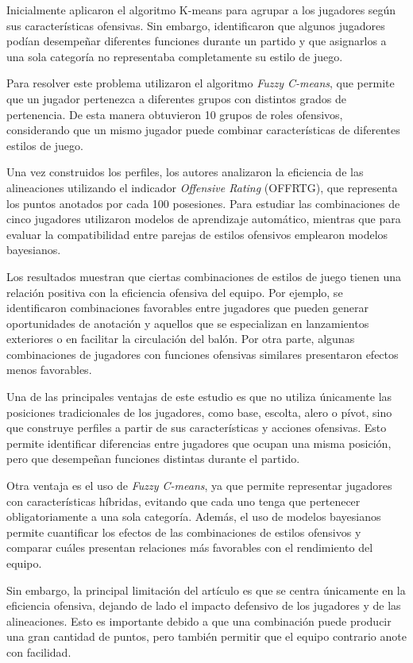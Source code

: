 Inicialmente aplicaron el algoritmo K-means para agrupar a los jugadores según sus características ofensivas. Sin embargo, identificaron que algunos jugadores podían desempeñar diferentes funciones durante un partido y que asignarlos a una sola categoría no representaba completamente su estilo de juego.

Para resolver este problema utilizaron el algoritmo \textit{Fuzzy C-means}, que permite que un jugador pertenezca a diferentes grupos con distintos grados de pertenencia. De esta manera obtuvieron 10 grupos de roles ofensivos, considerando que un mismo jugador puede combinar características de diferentes estilos de juego.

Una vez construidos los perfiles, los autores analizaron la eficiencia de las alineaciones utilizando el indicador \textit{Offensive Rating} (OFFRTG), que representa los puntos anotados por cada 100 posesiones. Para estudiar las combinaciones de cinco jugadores utilizaron modelos de aprendizaje automático, mientras que para evaluar la compatibilidad entre parejas de estilos ofensivos emplearon modelos bayesianos.

Los resultados muestran que ciertas combinaciones de estilos de juego tienen una relación positiva con la eficiencia ofensiva del equipo. Por ejemplo, se identificaron combinaciones favorables entre jugadores que pueden generar oportunidades de anotación y aquellos que se especializan en lanzamientos exteriores o en facilitar la circulación del balón. Por otra parte, algunas combinaciones de jugadores con funciones ofensivas similares presentaron efectos menos favorables.

Una de las principales ventajas de este estudio es que no utiliza únicamente las posiciones tradicionales de los jugadores, como base, escolta, alero o pívot, sino que construye perfiles a partir de sus características y acciones ofensivas. Esto permite identificar diferencias entre jugadores que ocupan una misma posición, pero que desempeñan funciones distintas durante el partido.

Otra ventaja es el uso de \textit{Fuzzy C-means}, ya que permite representar jugadores con características híbridas, evitando que cada uno tenga que pertenecer obligatoriamente a una sola categoría. Además, el uso de modelos bayesianos permite cuantificar los efectos de las combinaciones de estilos ofensivos y comparar cuáles presentan relaciones más favorables con el rendimiento del equipo.

Sin embargo, la principal limitación del artículo es que se centra únicamente en la eficiencia ofensiva, dejando de lado el impacto defensivo de los jugadores y de las alineaciones. Esto es importante debido a que una combinación puede producir una gran cantidad de puntos, pero también permitir que el equipo contrario anote con facilidad.

